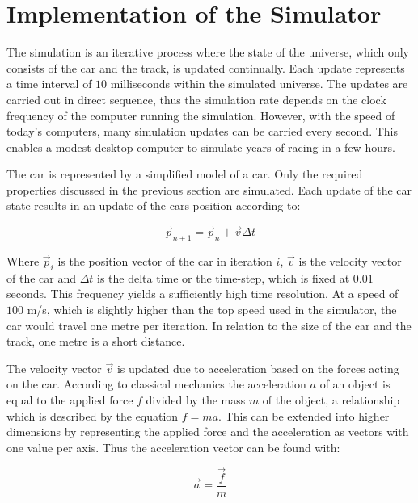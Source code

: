 \section{Implementation of the Simulator}

The simulation is an iterative process where the state of the universe, which only consists of the car and the track, is updated continually. Each update represents a time interval of $10$ milliseconds within the simulated universe. The updates are carried out in direct sequence, thus the simulation rate depends on the clock frequency of the computer running the simulation. However, with the speed of today's computers, many simulation updates can be carried every second. This enables a modest desktop computer to simulate years of racing in a few hours. 

The car is represented by a simplified model of a car. Only the required properties discussed in the previous section are simulated. Each update of the car state results in an update of the cars position according to:

\begin{equation}
    \vec{p}_{n+1} = \vec{p}_{n} + \vec{v}\Delta t 
\end{equation}

\noindent
Where $\vec{p}_i$ is the position vector of the car in iteration $i$, $\vec{v}$ is the velocity vector of the car and $\Delta t$ is the delta time or the time-step, which is fixed at $0.01$ seconds. This frequency yields a sufficiently high time resolution. At a speed of $100$ m/s, which is slightly higher than the top speed used in the simulator, the car would travel one metre per iteration. In relation to the size of the car and the track, one metre is a short distance.

The velocity vector $\vec{v}$ is updated due to acceleration based on the forces acting on the car. According to classical mechanics the acceleration $a$ of an object is equal to the applied force $f$ divided by the mass $m$ of the object, a relationship which is described by the equation $f = ma$. This can be extended into higher dimensions by representing the applied force and the acceleration as vectors with one value per axis. Thus the acceleration vector can be found with:

\begin{equation}
    \vec{a} = \frac{\vec{f}}{m}  
\end{equation}

